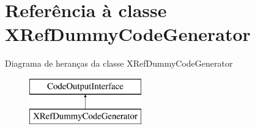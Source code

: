 \hypertarget{class_x_ref_dummy_code_generator}{\section{Referência à classe X\-Ref\-Dummy\-Code\-Generator}
\label{class_x_ref_dummy_code_generator}
}
Diagrama de heranças da classe X\-Ref\-Dummy\-Code\-Generator\begin{figure}[H]
\begin{center}
\leavevmode
\includegraphics[height=2.000000cm]{class_x_ref_dummy_code_generator}
\end{center}
\end{figure}
